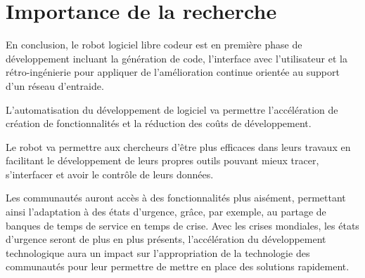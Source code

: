 







\section{Importance de la recherche}
En conclusion, le robot logiciel libre codeur est en première phase de développement incluant la génération de code, l'interface avec l'utilisateur et la rétro-ingénierie pour appliquer de l'amélioration continue orientée au support d'un réseau d'entraide. 

L’automatisation du développement de logiciel va permettre l’accélération de création de fonctionnalités et la réduction des coûts de développement. 

Le robot va permettre aux chercheurs d’être plus efficaces dans leurs travaux en facilitant le développement de leurs propres outils pouvant mieux tracer, s’interfacer et avoir le contrôle de leurs données.

Les communautés auront accès à des fonctionnalités plus aisément, permettant ainsi l'adaptation à des états d'urgence, grâce, par exemple, au partage de banques de temps de service en temps de crise. 
Avec les crises mondiales, les états d’urgence seront de plus en plus présents, l’accélération du développement technologique aura un impact sur l’appropriation de la technologie des communautés pour leur permettre de mettre en place des solutions rapidement.